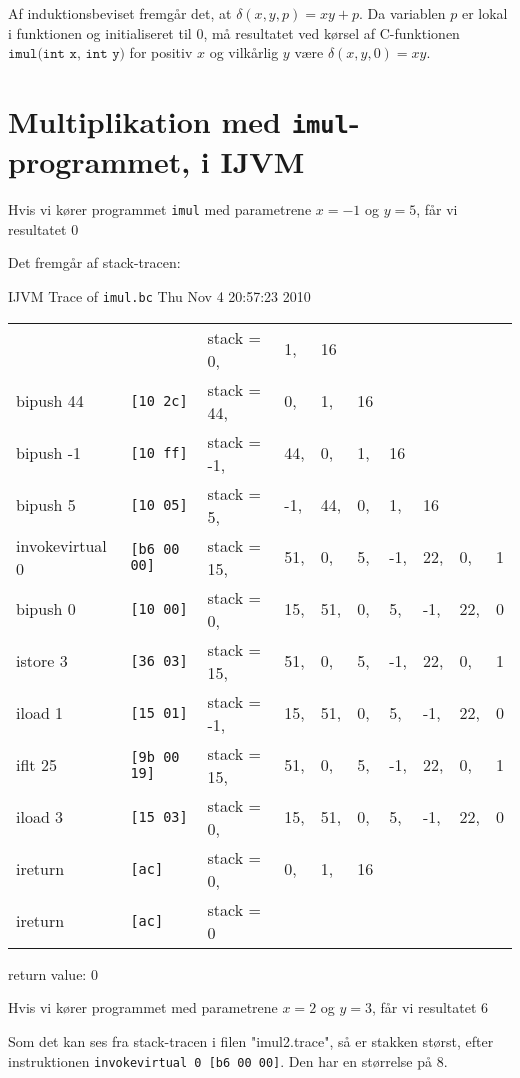\documentclass[12pt,a4paper]{article}
\newcommand{\imul}{\texttt{imul}}
\begin{document}
Af induktionsbeviset fremgår det, at $\delta(x,y,p)=xy+p$. Da variablen $p$ er
lokal i funktionen og initialiseret til $0$, må resultatet ved kørsel af
C-funktionen $\texttt{imul(int x, int y)}$ for positiv $x$ og vilkårlig $y$
være $\delta(x,y,0)=xy$.
\section{Multiplikation med \imul{}-programmet, i IJVM}
Hvis vi kører programmet \imul{} med parametrene $x=-1$ og $y=5$, får vi resultatet $0$

Det fremgår af stack-tracen:

IJVM Trace of \texttt{imul.bc} Thu Nov  4 20:57:23 2010

\begin{tabular}{llllllllll}
                &                    & stack = 0,& 1,& 16 \\
bipush 44       & \texttt{[10 2c]   }& stack = 44,& 0,& 1,& 16 \\
bipush -1       & \texttt{[10 ff]   }& stack = -1,& 44,& 0,& 1,& 16 \\
bipush 5        & \texttt{[10 05]   }& stack = 5,& -1,& 44,& 0,& 1,& 16 \\
invokevirtual 0 & \texttt{[b6 00 00]}& stack = 15,& 51,& 0,& 5,& -1,& 22,& 0,& 1 \\
bipush 0        & \texttt{[10 00]   }& stack = 0,& 15,& 51,& 0,& 5,& -1,& 22,& 0 \\
istore 3        & \texttt{[36 03]   }& stack = 15,& 51,& 0,& 5,& -1,& 22,& 0,& 1 \\
iload 1         & \texttt{[15 01]   }& stack = -1,& 15,& 51,& 0,& 5,& -1,& 22,& 0 \\
iflt 25         & \texttt{[9b 00 19]}& stack = 15,& 51,& 0,& 5,& -1,& 22,& 0,& 1 \\
iload 3         & \texttt{[15 03]   }& stack = 0,& 15,& 51,& 0,& 5,& -1,& 22,& 0 \\
ireturn         & \texttt{[ac]      }& stack = 0,& 0,& 1,& 16 \\
ireturn         & \texttt{[ac]      }& stack = 0
\end{tabular}

return value: $0$


Hvis vi kører programmet med parametrene $x=2$ og $y=3$, får vi resultatet $6$

Som det kan ses fra stack-tracen i filen "imul2.trace", så er stakken størst, efter instruktionen \texttt{invokevirtual 0 [b6 00 00]}. Den har en størrelse på $8$.
\end{document}
